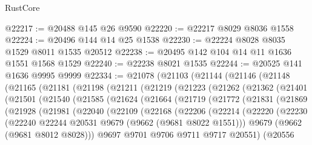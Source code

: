 \begin{lexlean}{RustCore}
\begin{coremodule}
@22217 := @20488 @145 @26 @9590
@22220 := @22217 @8029 @8036 @1558
@22224 := @20496 @144 @14 @25 @1538
@22230 := @22224 @8028 @8035 @1529 @8011 @1535 @20512
@22238 := @20495 @142 @104 @14 @11 @1636 @1551 @1568 @1529
@22240 := @22238 @8021 @1535
@22244 := @20525 @141 @1636 @9995 @9999
@22334 := @21078
    (@21103
      (@21144
        (@21146
          (@21148
            (@21165
              (@21181
                (@21198
                  (@21211
                    (@21219
                      (@21223
                        (@21262
                          (@21362
                            (@21401
                              (@21501
                                (@21540
                                  (@21585
                                    (@21624
                                      (@21664
                                        (@21719
                                          (@21772
                                            (@21831
                                              (@21869
                                                (@21928
                                                  (@21981
                                                    (@22040
                                                      (@22109
                                                        (@22168
                                                          (@22206
                                                            (@22214
                                                              (@22220
                                                                (@22230
                                                                  (@22240
                                                                    @22244
                                                                    @20531
                                                                    @9679
                                                                    (@9662 (@9681 @8022 @1551)))
                                                                  @9679
                                                                  (@9662 (@9681 @8012 @8028)))
                                                                @9697
                                                                @9701
                                                                @9706
                                                                @9711
                                                                @9717
                                                                @20551)
                                                              (@20556

\end{coremodule}
\end{lexlean}
